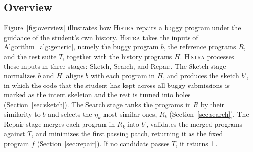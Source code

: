 \documentclass[10pt,conference]{IEEEtran}
\begin{document}
\subsection{Overview}\label{sec:overview}

Figure~\ref{fig:overview} illustrates how \textsc{Histra} repairs a buggy program under the guidance of the student's own history. \textsc{Histra} takes the inputs of Algorithm~\ref{alg:generic}, namely the buggy program $b$, the reference programs $R$, and the test suite $T$, together with the history programs $H$. \textsc{Histra} processes these inputs in three stages: Sketch, Search, and Repair. The Sketch stage normalizes $b$ and $H$, aligns $b$ with each program in $H$, and produces the sketch $b^{\square}$, in which the code that the student has kept across all buggy submissions is marked as the intent skeleton and the rest is turned into holes (Section~\ref{sec:sketch}). The Search stage ranks the programs in $R$ by their similarity to $b$ and selects the $\eta_k$ most similar ones, $R_k$ (Section~\ref{sec:search}). The Repair stage merges each program in $R_k$ into $b^{\square}$, validates the merged programs against $T$, and minimizes the first passing patch, returning it as the fixed program $f$ (Section~\ref{sec:repair}). If no candidate passes $T$, it returns $\bot$.
\end{document}
